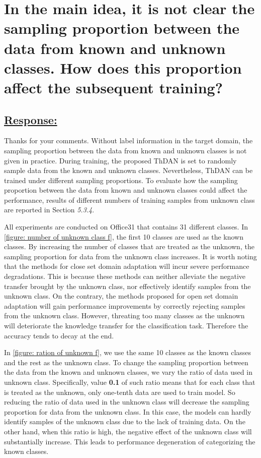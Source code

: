 \renewcommand\thesection{\Roman{section}}

\section{In the main idea, it is not clear the sampling proportion between the data from known and unknown classes. How does this proportion affect the subsequent training?}
\label{Question: class number}
\subsection*{\underline{\textbf{Response:}}}

Thanks for your comments.
Without label information in the target domain, the sampling proportion between the data from known and unknown classes is not given in practice. 
During training, the proposed ThDAN is set to randomly sample data from the known and unknown classes.
Nevertheless, ThDAN can be trained under different sampling proportions.
To evaluate how the sampling proportion between the data from known and unknown classes could affect the performance, results of different numbers of training samples from unknown class are reported in Section \textit{5.3.4}.


All experiments are conducted on Office31 that contains 31 different classes.
In \figurename{\ref{figure: number of unknown class f}}, the first 10 classes are used as the known classes.
By increasing the number of classes that are treated as the unknown, the sampling proportion for data from the unknown class increases.
It is worth noting that the methods for close set domain adaptation will incur severe performance degradations.
This is because these methods can neither alleviate the negative transfer brought by the unknown class, nor effectively identify samples from the unknown class.
On the contrary, the methods proposed for open set domain adaptation will gain performance improvements by correctly rejecting samples from the unknown class.
However, threating too many classes as the unknown will deteriorate the knowledge transfer for the classification task.
Therefore the accuracy tends to decay at the end.

In \figurename{\ref{figure: ration of unknown f}}, we use the same 10 classes as the known classes and the rest as the unknown class.
To change the sampling proportion between the data from the known and unknown classes, we vary the ratio of data used in unknown class.
Specifically, value \textbf{0.1} of such ratio means that for each class that is treated as the unknown, only one-tenth data are used to train model. 
So reducing the ratio of data used in the unknown class will decrease the sampling proportion for data from the unknown class.
In this case, the models can hardly identify samples of the unknown class due to the lack of training data.
On the other hand, when this ratio is high, the negative effect of the unknown class will substantially increase.
This leads to performance degeneration of categorizing the known classes.


